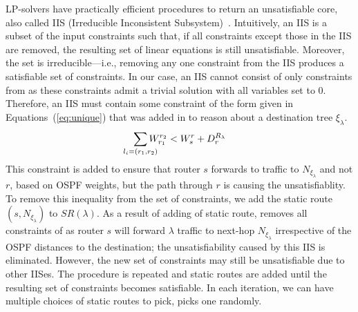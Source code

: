 LP-solvers have practically efficient procedures to return an
unsatisfiable core, also called IIS (Irreducible Inconsistent Subsystem)~\cite{chinneck2007feasibility}. 
Intuitively, an IIS is a subset of the input constraints such that,
if all constraints except those in the IIS are removed, the resulting set of
linear equations is still unsatisfiable. Moreover, the set is irreducible---i.e., removing 
any one constraint from the IIS produces a satisfiable set of constraints. 
In our case, an IIS cannot consist of only 
constraints from  as these constraints
admit a trivial solution with all variables set to 0. 
Therefore, an IIS must contain some constraint of the form
given in  Equations~(\ref{eq:unique})
that was added in to reason about a destination tree $\xi_\lambda$. 
\[
\sum_{\mathclap{\substack{l_i=(r_1,r_2)}}} 
W_{r_1}^{r_2} < W_s^r + D_r^{R_\lambda}  
\]	
This constraint is added to ensure 
that router $s$ forwards to traffic to  
$N_{\xi_\lambda}$ and not $r$, based on OSPF weights,
but the path through $r$ is causing the unsatisfiablity. 
To remove this inequality from the set of constraints, 
we add the static route $(s,N_{\xi_\lambda})$ to $SR(\lambda)$.
As a result of adding of static route, \name removes 
all constraints of  as router $s$ 
will forward $\lambda$ traffic  to 
next-hop $N_{\xi_\lambda}$ irrespective of
the OSPF distances to the destination; the 
unsatisfiability caused by this IIS is eliminated. 
However, the new set of
constraints may still be unsatisfiable due to other IISes.
The procedure is repeated and static routes are added 
until the resulting set of
constraints becomes satisfiable. 
In each iteration, we can have multiple 
choices of static routes to pick, 
\name picks one randomly. 

